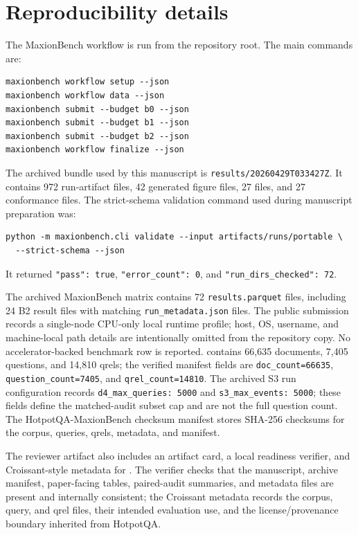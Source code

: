 \section{Reproducibility details}
\suppressfloats[t]

The MaxionBench workflow is run from the repository root. The main commands are:
\begin{verbatim}
maxionbench workflow setup --json
maxionbench workflow data --json
maxionbench submit --budget b0 --json
maxionbench submit --budget b1 --json
maxionbench submit --budget b2 --json
maxionbench workflow finalize --json
\end{verbatim}
The archived bundle used by this manuscript is \texttt{results/20260429T033427Z}. It contains 972 run-artifact files, 42 generated figure files, 27 \hotpotmaxionbench{} files, and 27 conformance files. The strict-schema validation command used during manuscript preparation was:
\begin{verbatim}
python -m maxionbench.cli validate --input artifacts/runs/portable \
  --strict-schema --json
\end{verbatim}
It returned \texttt{"pass": true}, \texttt{"error\_count": 0}, and \texttt{"run\_dirs\_checked": 72}.

The archived MaxionBench matrix contains 72 \texttt{results.parquet} files, including 24 B2 result files with matching \texttt{run\_metadata.json} files. The public submission records a single-node CPU-only local runtime profile; host, OS, username, and machine-local path details are intentionally omitted from the repository copy. No accelerator-backed benchmark row is reported. \hotpotmaxionbench{} contains 66{,}635 documents, 7{,}405 questions, and 14{,}810 qrels; the verified manifest fields are \texttt{doc\_count=66635}, \texttt{question\_count=7405}, and \texttt{qrel\_count=14810}. The archived S3 run configuration records \texttt{d4\_max\_queries: 5000} and \texttt{s3\_max\_events: 5000}; these fields define the matched-audit subset cap and are not the full \hotpotmaxionbench{} question count. The HotpotQA-MaxionBench checksum manifest stores SHA-256 checksums for the corpus, queries, qrels, metadata, and manifest.

The reviewer artifact also includes an artifact card, a local readiness verifier, and Croissant-style metadata for \hotpotmaxionbench{}. The verifier checks that the manuscript, archive manifest, paper-facing tables, paired-audit summaries, and metadata files are present and internally consistent; the Croissant metadata records the corpus, query, and qrel files, their intended evaluation use, and the license/provenance boundary inherited from HotpotQA.

